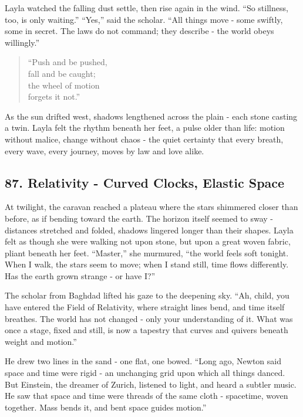 \documentclass[
  letterpaper,
  DIV=11,
  numbers=noendperiod]{scrreprt}
\begin{document}
Layla watched the falling dust settle, then rise again in the wind. ``So
stillness, too, is only waiting.'' ``Yes,'' said the scholar. ``All
things move - some swiftly, some in secret. The laws do not command;
they describe - the world obeys willingly.''

\begin{quote}
``Push and be pushed,\\
fall and be caught;\\
the wheel of motion\\
forgets it not.''
\end{quote}

As the sun drifted west, shadows lengthened across the plain - each
stone casting a twin. Layla felt the rhythm beneath her feet, a pulse
older than life: motion without malice, change without chaos - the quiet
certainty that every breath, every wave, every journey, moves by law and
love alike.

\subsection{87. Relativity - Curved Clocks, Elastic
Space}\label{relativity---curved-clocks-elastic-space}

At twilight, the caravan reached a plateau where the stars shimmered
closer than before, as if bending toward the earth. The horizon itself
seemed to sway - distances stretched and folded, shadows lingered longer
than their shapes. Layla felt as though she were walking not upon stone,
but upon a great woven fabric, pliant beneath her feet. ``Master,'' she
murmured, ``the world feels soft tonight. When I walk, the stars seem to
move; when I stand still, time flows differently. Has the earth grown
strange - or have I?''

The scholar from Baghdad lifted his gaze to the deepening sky. ``Ah,
child, you have entered the Field of Relativity, where straight lines
bend, and time itself breathes. The world has not changed - only your
understanding of it. What was once a stage, fixed and still, is now a
tapestry that curves and quivers beneath weight and motion.''

He drew two lines in the sand - one flat, one bowed. ``Long ago, Newton
said space and time were rigid - an unchanging grid upon which all
things danced. But Einstein, the dreamer of Zurich, listened to light,
and heard a subtler music. He saw that space and time were threads of
the same cloth - spacetime, woven together. Mass bends it, and bent
space guides motion.''
\end{document}
